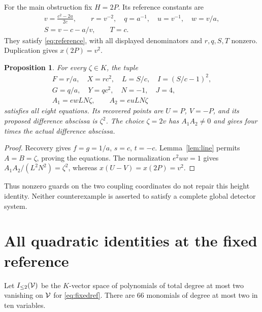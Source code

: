 \documentclass[11pt,a4paper]{article}
\newtheorem{proposition}[theorem]{Proposition}
\begin{document}
For the main obstruction fix $H=2P$. Its reference constants are
\begin{equation}\label{eq:fixedref}
\begin{gathered}
 v=\frac{c^2-2a}{2c},\qquad r=v^{-2},\quad q=a^{-1},\quad
 u=v^{-1},\quad w=v/a,\\
 S=v-c-a/v,\qquad T=c.
\end{gathered}
\end{equation}
They satisfy \eqref{eq:reference}, with all displayed denominators
and $r,q,S,T$ nonzero. Duplication gives $x(2P)=v^2$.

\begin{proposition}\label{prop:family}
For every $\zeta\in K$, the tuple
\begin{equation}\label{eq:family}
\begin{gathered}
 F=r/a,\quad X=rc^2,\quad L=S/c,\quad I=(S/c-1)^2,\\
 G=q/a,\quad Y=qc^2,\quad N=-1,\quad J=4,\\
 A_1=ewLN\zeta,\qquad A_2=euLN\zeta
\end{gathered}
\end{equation}
satisfies all eight equations. Its recovered points are $U=P$,
$V=-P$, and its proposed difference abscissa is $\zeta^2$.
The choice $\zeta=2v$ has $A_1A_2\ne0$ and gives four times
the actual difference abscissa.
\end{proposition}
\begin{proof}
Recovery gives $f=g=1/a$, $s=c$, $t=-c$.
Lemma~\ref{lem:line} permits $A=B=\zeta$, proving the equations.
The normalization $e^2uw=1$ gives
$A_1A_2/(L^2N^2)=\zeta^2$, whereas $x(U-V)=x(2P)=v^2$.
\end{proof}
Thus nonzero guards on the two coupling coordinates do not repair
this height identity. Neither counterexample is asserted to satisfy
a complete global detector system.

\section{All quadratic identities at the fixed reference}
Let $I_{\le2}(\mathcal V)$ be the $K$-vector space of polynomials of total
degree at most two vanishing on $\mathcal V$ for \eqref{eq:fixedref}.
There are $66$ monomials of degree at most two in ten variables.
\end{document}
